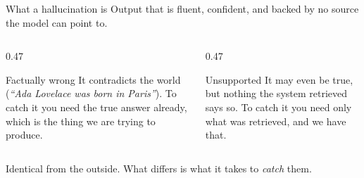 \begin{frame}{What a hallucination is}
  \bodyshift{-1.25pt}
  Output that is fluent, confident, and backed by \alert{no source the
  model can point to}.
  \vspace{-8pt}
  \begin{columns}[T]
    \begin{column}{0.47\textwidth}
      \begin{block}{Factually wrong}
        \agrraggedright
        It contradicts the world (\emph{``Ada Lovelace was born in
        Paris''}). To catch it you need the true answer already, which is
        the thing we are trying to produce.
      \end{block}
    \end{column}
    \begin{column}{0.47\textwidth}
      \begin{block}{Unsupported}
        \agrraggedright
        It may even be true, but nothing the system retrieved says so. To
        catch it you need \alert{only what was retrieved}, and we have that.
      \end{block}
    \end{column}
  \end{columns}
  \vspace{14pt}
  Identical from the outside. What differs is what it takes to
  \emph{catch} them.
\end{frame}


